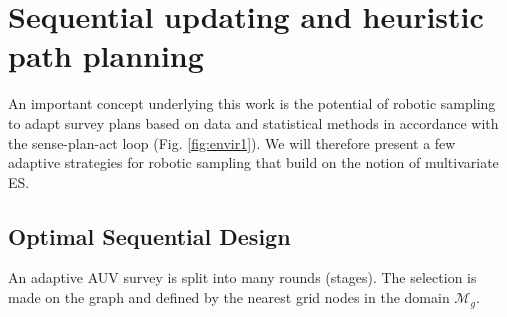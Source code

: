 \documentclass[aoas]{imsart}
\begin{document}





\section{Sequential updating and heuristic path planning}\label{sec:heuristics}

An important concept underlying this work is the potential of robotic sampling to adapt survey plans based on data and statistical methods
in accordance with the sense-plan-act loop
(Fig. \ref{fig:envir1}). We will therefore present a few adaptive strategies
for robotic sampling that build on the notion of multivariate ES. 

\subsection{Optimal Sequential Design}
\label{Optdes}

An adaptive AUV survey is split into many rounds (stages). The selection is made on the graph and defined by the nearest grid
nodes in the domain $\mathcal{M}_g$.
\end{document}
